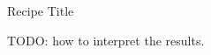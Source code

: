 \begin{recipe}[label=rec:CHANGE_ME]{Recipe Title}
\begin{interpretation}
  TODO: how to interpret the results.
\end{interpretation}

\begin{references}
\end{references}

\end{recipe}
